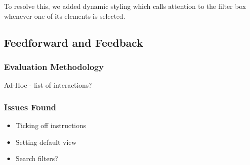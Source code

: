 To resolve this, we added dynamic styling which calls attention to the
filter box whenever one of its elements is selected.

\subsection{Feedforward and Feedback}

\subsubsection{Evaluation Methodology}

Ad-Hoc - list of interactions?

\subsubsection{Issues Found}

\begin{itemize}
\item Ticking off instructions
\item Setting default view
\item Search filters?
\end{itemize}
